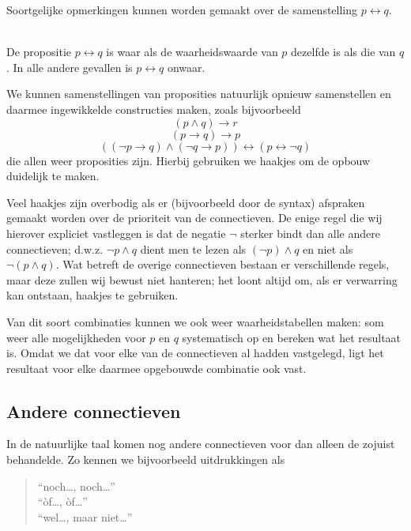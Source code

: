 \noindent Soortgelijke opmerkingen kunnen worden gemaakt over de samenstelling $p\leftrightarrow q$.
\begin{definition}[Bi-implicatie]\label{def:bi}\mbox{}\\
De propositie $p\leftrightarrow q$ is waar als de waarheidswaarde van $p$ dezelfde is als die van $q$. In alle andere gevallen is $p\leftrightarrow q$ onwaar.
\end{definition}

We kunnen samenstellingen van proposities natuurlijk opnieuw samenstellen en daarmee ingewikkelde constructies maken, zoals bijvoorbeeld
$$(p\land q)\rightarrow r$$
$$(p\rightarrow q)\rightarrow p$$
$$((\neg p\rightarrow q)\land(\neg q\rightarrow p))\leftrightarrow (p\leftrightarrow\neg q)$$
die allen weer proposities zijn. Hierbij gebruiken we haakjes om de opbouw duidelijk te maken.

Veel haakjes zijn overbodig als er (bijvoorbeeld door de syntax) afspraken gemaakt worden over de prioriteit van de connectieven. De enige regel die wij hierover expliciet vastleggen is dat de negatie $\neg$ sterker bindt dan alle andere connectieven; d.w.z. $\neg p\land q$ dient men te lezen als $(\neg p)\land q$ en niet als $\neg(p \land q)$. Wat betreft de overige connectieven bestaan er verschillende regels, maar deze zullen wij bewust niet hanteren; het loont altijd om, als er verwarring kan ontstaan, haakjes te gebruiken. 

Van dit soort combinaties kunnen we ook weer waarheidstabellen maken: som weer alle mogelijkheden voor $p$ en $q$ systematisch op en bereken wat het resultaat is. Omdat we dat voor elke van de connectieven al hadden vastgelegd, ligt het resultaat voor elke daarmee opgebouwde combinatie ook vast.

\subsection{Andere connectieven}
In de natuurlijke taal komen nog andere connectieven voor dan alleen de zojuist behandelde. Zo kennen we bijvoorbeeld uitdrukkingen als 
\begin{quote}
\enquote{noch\ldots, noch\ldots}\\
\enquote{\`of\ldots, \`of\ldots}\\
\enquote{wel\ldots, maar niet\ldots}
\end{quote}

